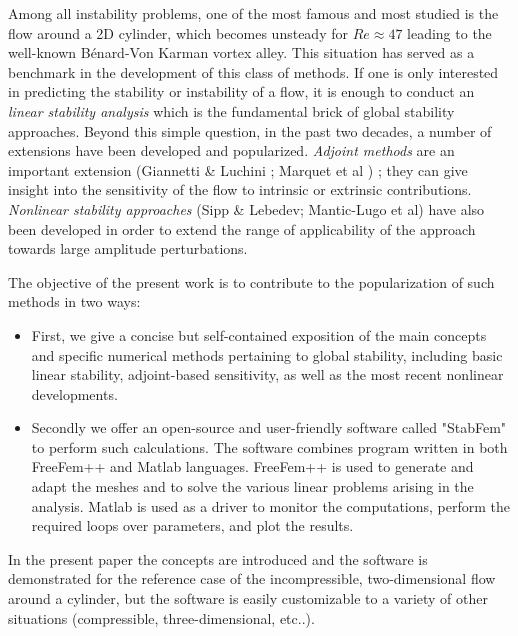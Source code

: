 \documentclass[twocolumn,10pt]{asme2ej}
\begin{document}
Among all instability problems, one of the most famous and most studied is the flow around a 2D cylinder, which becomes unsteady for $Re \approx 47$ leading to the well-known Bénard-Von Karman vortex alley. This situation has served as a benchmark in the development of this class of methods.  
If one is only interested in predicting the stability or instability of a flow, it is enough to conduct an  {\em linear stability analysis} which is the fundamental brick of global stability approaches. 
Beyond this simple question, in the past two decades, a number of extensions have been developed and popularized.  {\em Adjoint methods} are an important extension (Giannetti \& Luchini ; Marquet et al ) ; they can give insight into the sensitivity of the flow to intrinsic or extrinsic contributions. 
{\em Nonlinear stability approaches} (Sipp \& Lebedev; Mantic-Lugo et al) have also been developed in order to extend the range of applicability of the approach towards large amplitude perturbations.






The objective of the present work is to contribute to the popularization of such methods 
in two ways:
\begin{itemize}
\item
First, we give a concise but self-contained exposition of the main concepts and 
specific numerical methods pertaining to global stability, including basic linear stability, adjoint-based sensitivity, as well as the most recent nonlinear developments.
\item
Secondly we offer an open-source and user-friendly software called  "StabFem" to perform such calculations. The software combines program written in both FreeFem++ and Matlab languages. 
FreeFem++ is used to generate and adapt the meshes and to solve the various linear problems arising in the analysis. Matlab is used as a driver to monitor the computations, perform the required loops over parameters, and plot the results.
\end{itemize}

In the present paper the concepts are introduced and the software is demonstrated for the reference case of the incompressible, two-dimensional flow around a cylinder, but the software is easily customizable to a variety of other situations (compressible, three-dimensional, etc..).
\end{document}
